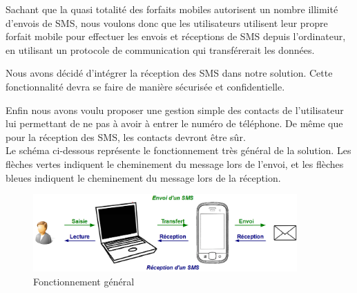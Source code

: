 Sachant que la quasi totalité des forfaits mobiles autorisent un nombre illimité d'envois de SMS, nous voulons donc que les utilisateurs utilisent leur propre forfait mobile pour effectuer les envois et réceptions de SMS depuis l'ordinateur, en utilisant un protocole de communication qui transférerait les données.

Nous avons décidé d'intégrer la réception des SMS dans notre solution.
Cette fonctionnalité devra se faire de manière sécurisée et confidentielle.

Enfin nous avons voulu proposer une gestion simple des contacts de l'utilisateur lui permettant de ne pas à avoir à entrer le numéro de téléphone.
De même que pour la réception des SMS, les contacts devront être sûr.
\\


Le schéma ci-dessous représente le fonctionnement très général de la solution.
Les flèches vertes indiquent le cheminement du message lors de l'envoi, et les flèches bleues indiquent le cheminement du message lors de la réception.

\begin{figure}[!h]
	\center
	\includegraphics[width=0.9\textwidth]{img/schemaFonctionnement_general.png}
	\caption{Fonctionnement général}
	\label{schemaFonctionnement_general}
\end{figure}

